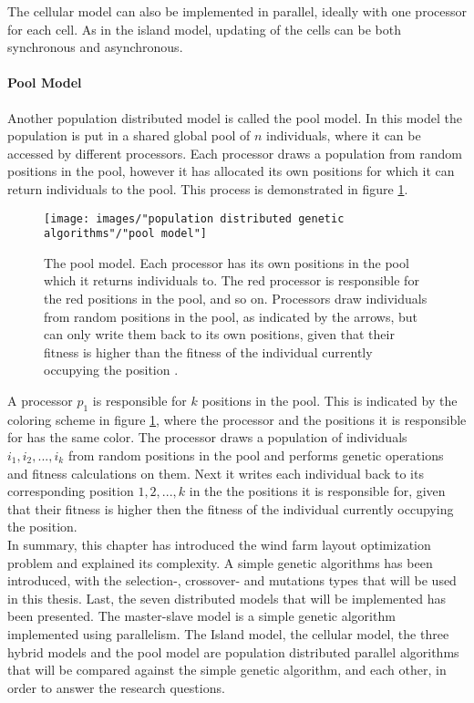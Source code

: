 \noindent The cellular model can also be implemented in parallel, ideally with one processor for each cell. As in the island model, updating of the cells can be both synchronous and asynchronous.


\paragraph*{Pool Model}
Another population distributed model is called the pool model. In this model the population is put in a shared global pool of $n$ individuals, where it can be accessed by different processors. Each processor draws a population from random positions in the pool, however it has allocated its own positions for which it can return individuals to the pool. This process is demonstrated in figure \ref{Pool Model}. \\


\begin{figure}[h!]
\begin{center}
\texttt{[image: images/"population distributed genetic algorithms"/"pool model"]}
\caption{The pool model. Each processor has its own positions in the pool which it returns individuals to. The red processor is responsible for the red positions in the pool, and so on. Processors draw individuals from random positions in the pool, as indicated by the arrows, but can only write them back to its own positions, given that their fitness is higher than the fitness of the individual currently occupying the position \citep{Gong}.}
\label{Pool Model}
\end{center}
\end{figure}


\noindent A processor $p_1$ is responsible for $k$ positions in the pool. This is indicated by the coloring scheme in figure \ref{Pool Model}, where the processor and the positions it is responsible for has the same color. The processor draws a population of individuals $i_1, i_2,...,i_k$ from random positions in the pool and performs genetic operations and fitness calculations on them. Next it writes each individual back to its corresponding position $1, 2,...,k$ in the the positions it is responsible for, given that their fitness is higher then the fitness of the individual currently occupying the position.\\


\noindent In summary, this chapter has introduced the wind farm layout optimization problem and explained its complexity. A simple genetic algorithms has been introduced, with the selection-, crossover- and mutations types that will be used in this thesis. Last, the seven distributed models that will be implemented has been presented. The master-slave model is a simple genetic algorithm implemented using parallelism. The Island model, the cellular model, the three hybrid models and the pool model are population distributed parallel algorithms that  will be compared against the simple genetic algorithm, and each other, in order to answer the research questions. 
